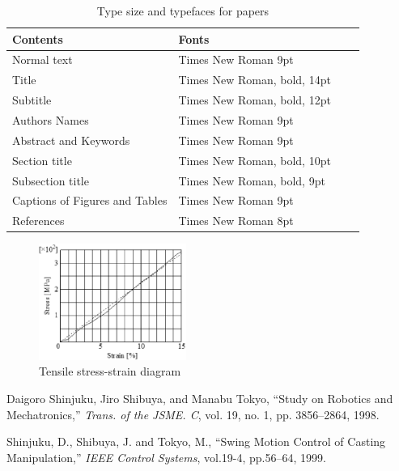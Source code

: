 \documentclass[a4paper]{article}
\begin{document}
\begin{table}[tb]
 \caption{Type size and typefaces for papers}
 \label{tbl: table1}
 \centering
 \footnotesize
 \begin{tabular}{|p{35mm}|l|l|l|}
  \hline
	Contents	&Fonts \\\hline
	Normal text	&Times New Roman 9pt \\\hline
	Title	&Times New Roman, bold, 14pt \\\hline
	Subtitle	&Times New Roman, bold, 12pt \\\hline
	Authors Names	&Times New Roman 9pt \\\hline
	Abstract and Keywords	&Times New Roman 9pt \\\hline
	Section title		&Times New Roman, bold, 10pt \\\hline
	Subsection title		&Times New Roman, bold, 9pt \\\hline
	Captions of Figures and Tables	 &Times New Roman 9pt \\\hline
	References		&Times New Roman 8pt \\
  \hline
 \end{tabular}
\end{table}

\begin{figure}[tbh]
 \centering
  \includegraphics[height=38mm]{fig1.eps}
  \vspace*{-4mm}
  \caption{Tensile stress-strain diagram}
  \label{fig: fig1}
\end{figure}

\footnotesize
\begin{thebibliography}{99}

Daigoro Shinjuku, Jiro Shibuya, and Manabu Tokyo, ``Study on Robotics and Mechatronics,'' {\it Trans. of the JSME. C}, vol. 19, no. 1, pp. 3856--2864, 1998.


Shinjuku, D., Shibuya, J. and Tokyo, M., ``Swing Motion Control of Casting Manipulation,'' {\it IEEE Control Systems}, vol.19-4, pp.56--64, 1999.

\end{thebibliography}

\normalsize
\end{document}
